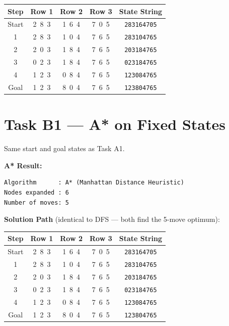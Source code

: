 \documentclass[12pt, a4paper]{article}
\begin{document}
\begin{center}
\begin{tabular}{ccccc}
\toprule
\textbf{Step} & \textbf{Row 1} & \textbf{Row 2} & \textbf{Row 3} & \textbf{State String} \\
\midrule
Start & 2\ 8\ 3 & 1\ 6\ 4 & 7\ 0\ 5 & \texttt{283164705} \\
1     & 2\ 8\ 3 & 1\ 0\ 4 & 7\ 6\ 5 & \texttt{283104765} \\
2     & 2\ 0\ 3 & 1\ 8\ 4 & 7\ 6\ 5 & \texttt{203184765} \\
3     & 0\ 2\ 3 & 1\ 8\ 4 & 7\ 6\ 5 & \texttt{023184765} \\
4     & 1\ 2\ 3 & 0\ 8\ 4 & 7\ 6\ 5 & \texttt{123084765} \\
\rowcolor{lightblue}
Goal  & 1\ 2\ 3 & 8\ 0\ 4 & 7\ 6\ 5 & \texttt{123804765} \\
\bottomrule
\end{tabular}
\end{center}

\section{Task B1 --- A* on Fixed States}

Same start and goal states as Task A1.

\textbf{A* Result:}
\begin{lstlisting}[style=mono]
Algorithm      : A* (Manhattan Distance Heuristic)
Nodes expanded : 6
Number of moves: 5
\end{lstlisting}

\textbf{Solution Path} (identical to DFS --- both find the 5-move optimum):

\begin{center}
\begin{tabular}{ccccc}
\toprule
\textbf{Step} & \textbf{Row 1} & \textbf{Row 2} & \textbf{Row 3} & \textbf{State String} \\
\midrule
Start & 2\ 8\ 3 & 1\ 6\ 4 & 7\ 0\ 5 & \texttt{283164705} \\
1     & 2\ 8\ 3 & 1\ 0\ 4 & 7\ 6\ 5 & \texttt{283104765} \\
2     & 2\ 0\ 3 & 1\ 8\ 4 & 7\ 6\ 5 & \texttt{203184765} \\
3     & 0\ 2\ 3 & 1\ 8\ 4 & 7\ 6\ 5 & \texttt{023184765} \\
4     & 1\ 2\ 3 & 0\ 8\ 4 & 7\ 6\ 5 & \texttt{123084765} \\
\rowcolor{lightblue}
Goal  & 1\ 2\ 3 & 8\ 0\ 4 & 7\ 6\ 5 & \texttt{123804765} \\
\bottomrule
\end{tabular}
\end{center}
\end{document}
